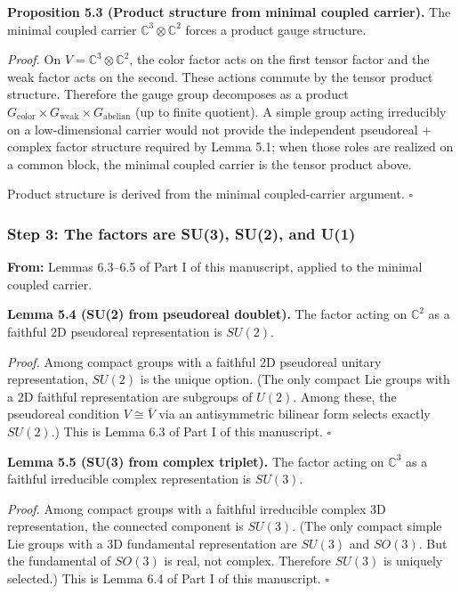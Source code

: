 \textbf{Proposition 5.3 (Product structure from minimal coupled carrier).} The minimal coupled carrier \(\mathbb{C}^3 \otimes \mathbb{C}^2\) forces a product gauge structure.

\emph{Proof.} On \(V = \mathbb{C}^3 \otimes \mathbb{C}^2\), the color factor acts on the first tensor factor and the weak factor acts on the second. These actions commute by the tensor product structure. Therefore the gauge group decomposes as a product \(G_{\mathrm{color}} \times G_{\mathrm{weak}} \times G_{\mathrm{abelian}}\) (up to finite quotient). A simple group acting irreducibly on a low-dimensional carrier would not provide the independent pseudoreal + complex factor structure required by Lemma 5.1; when those roles are realized on a common block, the minimal coupled carrier is the tensor product above.

Product structure is derived from the minimal coupled-carrier argument. \(\square\)

\subsubsection{Step 3: The factors are SU(3), SU(2), and U(1)}\label{step-3-the-factors-are-su3-su2-and-u1}

\textbf{From:} Lemmas 6.3--6.5 of Part I of this manuscript, applied to the minimal coupled carrier.

\textbf{Lemma 5.4 (SU(2) from pseudoreal doublet).} The factor acting on \(\mathbb{C}^2\) as a faithful 2D pseudoreal representation is \(SU(2)\).

\emph{Proof.} Among compact groups with a faithful 2D pseudoreal unitary representation, \(SU(2)\) is the unique option. (The only compact Lie groups with a 2D faithful representation are subgroups of \(U(2)\). Among these, the pseudoreal condition \(V \cong \bar{V}\) via an antisymmetric bilinear form selects exactly \(SU(2)\).) This is Lemma 6.3 of Part I of this manuscript. \(\square\)

\textbf{Lemma 5.5 (SU(3) from complex triplet).} The factor acting on \(\mathbb{C}^3\) as a faithful irreducible complex representation is \(SU(3)\).

\emph{Proof.} Among compact groups with a faithful irreducible complex 3D representation, the connected component is \(SU(3)\). (The only compact simple Lie groups with a 3D fundamental representation are \(SU(3)\) and \(SO(3)\). But the fundamental of \(SO(3)\) is real, not complex. Therefore \(SU(3)\) is uniquely selected.) This is Lemma 6.4 of Part I of this manuscript. \(\square\)

